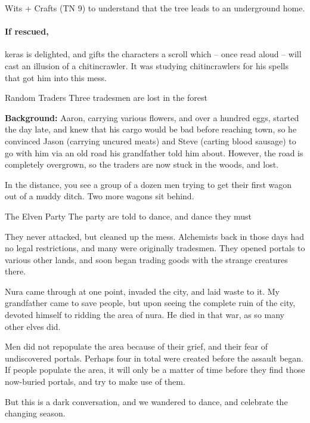 Wits + Crafts (TN 9) to understand that the tree leads to an underground home.

\chitincrawler

\keras

\paragraph{If rescued,}
\gls{keras} is delighted, and gifts the characters a scroll which -- once read aloud -- will cast an illusion of a chitincrawler.  It was studying chitincrawlers for his spells that got him into this mess.

{Random Traders}%
{Three tradesmen are lost in the forest}%

\textbf{Background:}
Aaron, carrying various flowers, and over a hundred eggs, started the day late, and knew that his cargo would be bad before reaching \gls{town}, so he convinced Jason (carrying uncured meats) and Steve (carting blood sausage) to go with him via an old road his grandfather told him about.
However, the road is completely overgrown, so the traders are now stuck in the woods, and lost.

\begin{boxtext}
  In the distance, you see a group of a dozen men trying to get their first wagon out of a muddy ditch.
  Two more wagons sit behind.
\end{boxtext}


{The Elven Party}%
{The party are told to dance, and dance they must}%

\begin{figure*}[b]
\begin{speechtext}

  They never attacked, but cleaned up the mess.  Alchemists back in those days had no legal restrictions, and many were originally tradesmen.  They opened portals to various other lands, and soon began trading goods with the strange creatures there.

  Nura came through at one point, invaded the city, and laid waste to it.  My grandfather came to save people, but upon seeing the complete ruin of the city, devoted himself to ridding the area of nura.  He died in that war, as so many other elves did.

  Men did not repopulate the area because of their grief, and their fear of undiscovered portals.
  Perhaps four in total were created before the assault began.
  If people populate the area, it will only be a matter of time before they find those now-buried portals, and try to make use of them.

  But this is a dark conversation, and we wandered to dance, and celebrate the changing season.

\end{speechtext}
\end{figure*}

